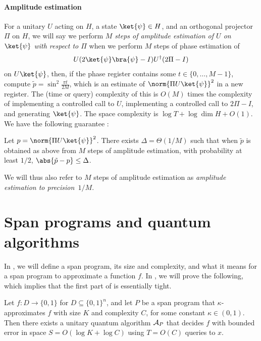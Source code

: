 \documentclass{toc}
\begin{document}
\paragraph{Amplitude estimation} For a unitary $U$ acting on $H$, a state $\ket{\psi}\in H$, and an orthogonal projector $\Pi$ on $H$, we will say we perform \emph{$M$ steps of amplitude estimation of $U$ on $\ket{\psi}$ with respect to $\Pi$} when we perform $M$ steps of phase estimation of 
$$U(2\ket{\psi}\bra{\psi}-I)U^\dagger (2\Pi-I)$$
on $U\ket{\psi}$, then, if the phase register contains some $t\in\{0,\dots,M-1\}$, compute $\tilde p=\sin^2\frac{\pi t}{2M}$, which is an estimate of $\norm{\Pi U\ket{\psi}}^2$ in a new register. The (time or query) complexity of this is $O(M)$ times the complexity of implementing a controlled call to $U$, implementing a controlled call to $2\Pi-I$, and generating $\ket{\psi}$. The space complexity is $\log T + \log\dim H+O(1)$. We have the following guarantee \cite{BHMT02}:
\begin{lemma}
Let $p=\norm{\Pi U\ket{\psi}}^2$. There exists $\Delta=\Theta(1/M)$ such that when $\tilde p$ is obtained as above from $M$ steps of amplitude estimation, 
with probability at least $1/2$, $\abs{\tilde p - p}\leq \Delta$. 
\end{lemma}
\noindent We will thus also refer to $M$ steps of amplitude estimation as \emph{amplitude estimation to precision~$1/M$}. 





\section{Span programs and quantum algorithms}\label{sec:span-alg}

In , we will define a span program, its size and complexity, and what it means for a span program to approximate a function $f$. In , we will prove the following, which implies that the first part of  is essentially tight. 

\begin{theorem}\label{thm:span-to-alg}
Let $f:D\rightarrow\{0,1\}$ for $D\subseteq\{0,1\}^n$, and let $P$ be a span program that $\kappa$-approximates $f$ with size $K$ and complexity $C$, for some constant $\kappa\in (0,1)$. Then there exists a unitary quantum algorithm ${\cal A}_P$ that decides $f$ with bounded error in space $S=O(\log K+\log C)$ using $T=O(C)$ queries to $x$. 
\end{theorem}
\end{document}
